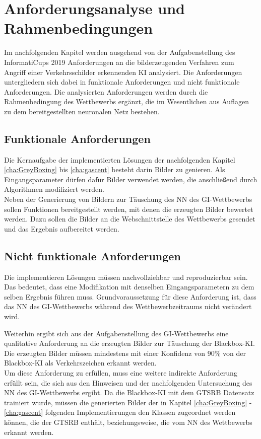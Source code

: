 \chapter{Anforderungsanalyse und Rahmenbedingungen}
\label{cha:AnfAnalyse}
Im nachfolgenden Kapitel werden ausgehend von der Aufgabenstellung des InformatiCups 2019 Anforderungen an die bilderzeugenden Verfahren zum Angriff einer Verkehrsschilder erkennenden \ac{KI} analysiert. 
Die Anforderungen untergliedern sich dabei in funktionale Anforderungen und nicht funktionale Anforderungen. 
Die analysierten Anforderungen werden durch die Rahmenbedingung des Wettbewerbs ergänzt, die im Wesentlichen aus Auflagen zu dem bereitgestellten neuronalen Netz bestehen.

\section{Funktionale Anforderungen}
Die Kernaufgabe der implementierten Lösungen der nachfolgenden Kapitel \ref{cha:GreyBoxing} bis \ref{cha:gascent} besteht darin Bilder zu genieren. 
Als Eingangsparameter dürfen dafür Bilder verwendet werden, die anschließend durch Algorithmen modifiziert werden.\\
Neben der Generierung von Bildern zur Täuschung des \ac{NN} des \ac{GI}-Wettbewerbs sollen Funktionen bereitgestellt werden, mit denen die erzeugten Bilder bewertet werden. 
Dazu sollen die Bilder an die Webschnittstelle des Wettbewerbs gesendet und das Ergebnis aufbereitet werden.

\section{Nicht funktionale Anforderungen}
Die implementieren Lösungen müssen nachvollziehbar und reproduzierbar sein. 
Das bedeutet, dass eine Modifikation mit denselben Eingangsparametern zu dem selben Ergebnis führen muss. 
Grundvoraussetzung für diese Anforderung ist, dass das \ac{NN} des \ac{GI}-Wettbewerbs während des Wettbewerbzeitraums nicht verändert wird.

Weiterhin ergibt sich aus der Aufgabenstellung des \ac{GI}-Wettbewerbs eine qualitative Anforderung an die erzeugten Bilder zur Täuschung der Blackbox-\ac{KI}. 
Die erzeugten Bilder müssen mindestens mit einer Konfidenz von 90\% von der Blackbox-\ac{KI} als Verkehrszeichen erkannt werden. \cite{gesellschaft_fur_informatik_e.v._informaticup2019-irrbilder.pdf_2018} \\
Um diese Anforderung zu erfüllen, muss eine weitere indirekte Anforderung erfüllt sein, die sich aus den Hinweisen und der nachfolgenden Untersuchung des \ac{NN} des \ac{GI}-Wettbewerbs ergibt. 
Da die Blackbox-\ac{KI} mit dem \ac{GTSRB} Datensatz trainiert wurde, müssen die generierten Bilder der in Kapitel \ref{cha:GreyBoxing} - \ref{cha:gascent} folgenden Implementierungen den Klassen zugeordnet werden können, die der \ac{GTSRB} enthält, beziehungsweise, die vom \ac{NN} des Wettbewerbs erkannt werden. 

